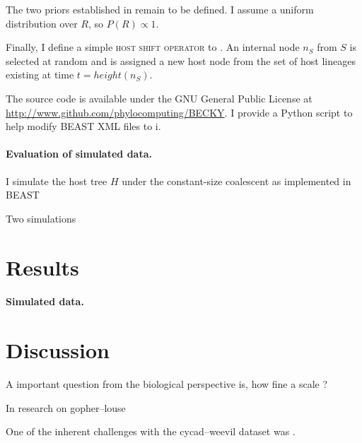 \documentclass[12pt,letterpaper]{article}
\begin{document}
The two priors established in  remain to be defined. I assume a uniform distribution over $R$, so $P(R) \propto 1$.

Finally, I define a simple \textsc{host shift operator} to . An internal node $n_S$ from $S$ is selected at random and is assigned a new host node from the set of host lineages existing at time $t = height(n_S)$.\

The source code is available under the GNU General Public License at \url{http://www.github.com/phylocomputing/BECKY}. I provide a Python script to help modify BEAST XML files to i.

\paragraph*{Evaluation of simulated data.}

I simulate the host tree $H$ under the constant-size coalescent \parencite{Kingman:1982} as implemented in BEAST \parencite{Drummond:2012}

Two simulations




\section*{Results}

\paragraph*{Simulated data.}


\section*{Discussion}

A important question from the biological perspective is, how fine a scale ? 

In research on gopher--louse

One of the inherent challenges with the cycad--weevil dataset was . 
\end{document}
